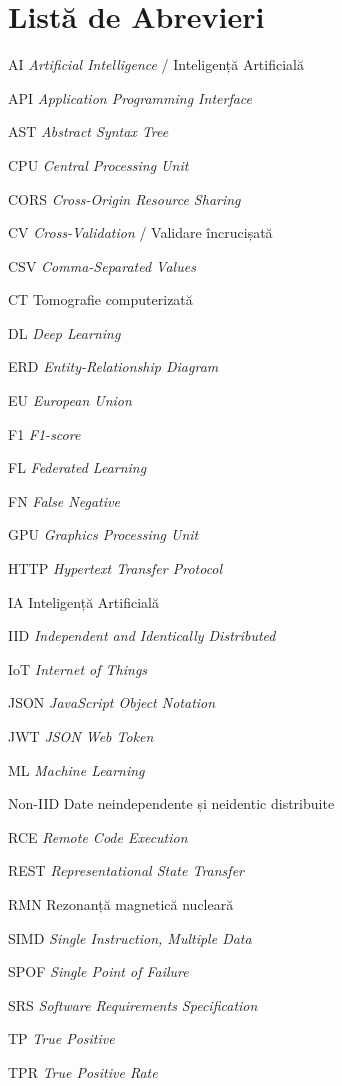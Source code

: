 \chapter*{Listă de Abrevieri}

\thispagestyle{front}

\begin{abbreviations}
    \item[AI] \textit{Artificial Intelligence} / Inteligență Artificială
    \item[API] \textit{Application Programming Interface}
    \item[AST] \textit{Abstract Syntax Tree}
    \item[CPU] \textit{Central Processing Unit}
    \item[CORS] \textit{Cross-Origin Resource Sharing}
    \item[CV] \textit{Cross-Validation} / Validare încrucișată
    \item[CSV] \textit{Comma-Separated Values}
    \item[CT] Tomografie computerizată
    \item[DL] \textit{Deep Learning}
    \item[ERD] \textit{Entity-Relationship Diagram}
    \item[EU] \textit{European Union}
    \item[F1] \textit{F1-score}
    \item[FL] \textit{Federated Learning}
    \item[FN] \textit{False Negative}
    \item[GPU] \textit{Graphics Processing Unit}
    \item[HTTP] \textit{Hypertext Transfer Protocol}
    \item[IA] Inteligență Artificială
    \item[IID] \textit{Independent and Identically Distributed}
    \item[IoT] \textit{Internet of Things}
    \item[JSON] \textit{JavaScript Object Notation}
    \item[JWT] \textit{JSON Web Token}
    \item[ML] \textit{Machine Learning}
    \item[Non-IID] Date neindependente și neidentic distribuite
    \item[RCE] \textit{Remote Code Execution}
    \item[REST] \textit{Representational State Transfer}
    \item[RMN] Rezonanță magnetică nucleară
    \item[SIMD] \textit{Single Instruction, Multiple Data}
    \item[SPOF] \textit{Single Point of Failure}
    \item[SRS] \textit{Software Requirements Specification}
    \item[TP] \textit{True Positive}
    \item[TPR] \textit{True Positive Rate}
\end{abbreviations}

\newpage \
